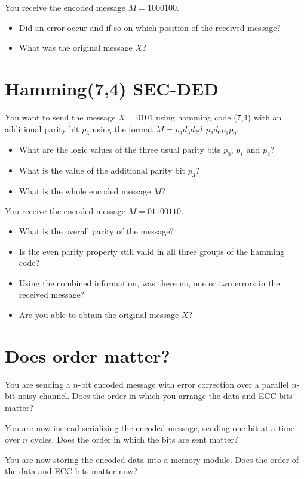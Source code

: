 \documentclass[a4paper]{article}
\newif\ifsolution
\newcommand{\sol}[1]{%
\ifsolution
\textcolor{red}{#1}
\fi
}
\begin{document}
\noindent You receive the encoded message $M=1000100$.
\begin{itemize}
    \item Did an error occur and if so on which position of the received message? \sol{error on position 4 (1-indexed)}
    \item What was the original message $X$? \sol{1001}
\end{itemize}

\section{Hamming(7,4) SEC-DED}

You want to send the message $X=0101$ using hamming code (7,4) with an additional parity bit $p_3$ using the format $M=p_3d_3d_2d_1p_2d_0p_1p_0$.
\begin{itemize}
    \item What are the logic values of the three usual parity bits $p_0$, $p_1$ and $p_2$? \sol{$p_{2:0}=101$}
    \item What is the value of the additional parity bit $p_3$? \sol{$p_3=0$}
    \item What is the whole encoded message $M$? \sol{00101101}
\end{itemize}

\noindent You receive the encoded message $M=01100110$.
\begin{itemize}
    \item What is the overall parity of the message? \sol{even}
    \item Is the even parity property still valid in all three groups of the hamming code? \sol{yes}
    \item Using the combined information, was there no, one or two errors in the received message? \sol{no error}
    \item Are you able to obtain the original message $X$? \sol{1101}
\end{itemize}

\section{Does order matter?}
You are sending a $n$-bit encoded message with error correction over a parallel $n$-bit noisy channel. 
Does the order in which you arrange the data and ECC bits matter? 

You are now instead serializing the encoded message, sending one bit at a time over $n$ cycles. 
Does the order in which the bits are sent matter?

You are now storing the encoded data into a memory module. Does the order of the data and ECC bits matter now?
\end{document}
